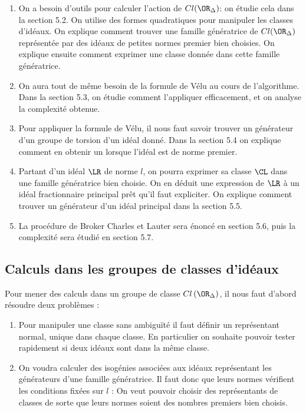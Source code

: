 \begin{enumerate}
	\item On a besoin d'outils pour calculer l'action de $Cl(\OR_{\Delta})$: on étudie cela dans la section 5.2. On utilise des formes quadratiques pour manipuler les classes d'idéaux. On explique comment trouver une famille génératrice de $Cl(\OR_{\Delta})$ représentée par des idéaux de petites normes premier bien choisies. On explique ensuite comment exprimer une classe donnée dans cette famille génératrice.
	\item On aura tout de même besoin de la formule de Vélu au cours de l'algorithme. Dans la section 5.3, on étudie comment l'appliquer efficacement, et on analyse la complexité obtenue. 
	\item Pour appliquer la formule de Vélu, il nous faut savoir trouver un générateur d'un groupe de torsion d'un idéal donné. Dans la section 5.4 on explique comment en obtenir un lorsque l'idéal est de norme premier.
	\item Partant d'un idéal $\LR$ de norme $l$, on pourra exprimer sa classe $\CL$ dans une famille génératrice bien choisie. On en déduit une expression de $\LR$ à un idéal fractionnaire principal prêt qu'il faut expliciter. On explique comment trouver un générateur d'un idéal principal dans la section 5.5.
	\item La procédure de Broker Charles et Lauter sera énoncé en section 5.6, puis la complexité sera étudié en section 5.7. 
\end{enumerate}







\subsection{Calculs dans les groupes de classes d'idéaux}


Pour mener des calculs dans un groupe de classe $Cl\left(\OR_{\Delta} \right)$, il nous faut d'abord résoudre deux problèmes :
\begin{enumerate}
	\item Pour manipuler une classe sans ambiguïté il faut définir un représentant normal, unique dans chaque classe. En particulier on souhaite pouvoir tester rapidement si deux idéaux sont dans la même classe.
	\item On voudra calculer des isogénies associées aux idéaux représentant les générateurs d'une famille génératrice. Il faut donc que leurs normes vérifient les conditions fixées sur $l$ : On veut pouvoir choisir des représentants de classes de sorte que leurs normes soient des nombres premiers bien choisis. 
\end{enumerate}

